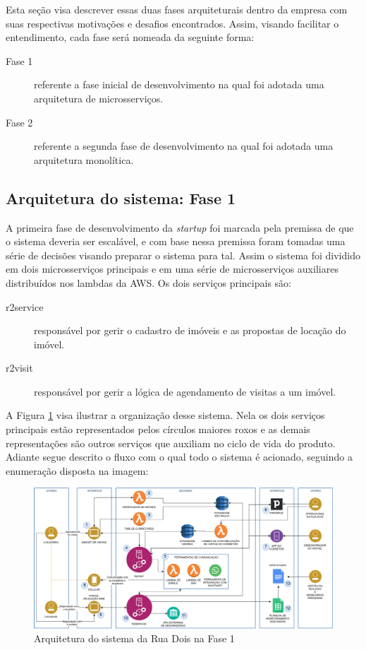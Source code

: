 Esta seção visa descrever essas duas fases arquiteturais dentro da empresa com suas
respectivas motivações e desafios encontrados. Assim, visando facilitar o entendimento,
cada fase será nomeada da seguinte forma:

    \begin{description}
        \item [Fase 1] referente a fase inicial de desenvolvimento na qual foi adotada
        uma arquitetura de microsserviços.
        \item [Fase 2] referente a segunda fase de desenvolvimento na qual foi adotada
        uma arquitetura monolítica.
    \end{description}


\subsection{Arquitetura do sistema: Fase 1}
\label{sec:ArquiteturaFase1}

A primeira fase de desenvolvimento da \textit{startup} foi marcada pela premissa de
que o sistema deveria ser escalável, e com base nessa premissa foram tomadas uma
série de decisões visando preparar o sistema para tal. Assim o sistema foi dividido 
em dois microsserviços principais e em uma série de microsserviços auxiliares
distribuídos nos lambdas da AWS. Os dois serviços principais são:

    \begin{description}
        \item [r2service] responsável por gerir o cadastro de imóveis e as propostas
        de locação do imóvel.
        \item [r2visit] responsável por gerir a lógica de agendamento de visitas
        a um imóvel.
    \end{description}

A Figura \ref{fig:ArquiteturaFase1} visa ilustrar a organização desse sistema. Nela
os dois serviços principais estão representados pelos círculos maiores roxos e as
demais representações são outros serviços que auxiliam no ciclo de vida do produto.
Adiante segue descrito o fluxo com o qual todo o sistema é acionado, seguindo a
enumeração disposta na imagem:

\begin{figure}[h]
  \centering
  \includegraphics[keepaspectratio=true,scale=0.3]{figuras/r2ArquiteturaFase1.eps}
  \caption{Arquitetura do sistema da Rua Dois na Fase 1}
  \label{fig:ArquiteturaFase1}
\end{figure}

